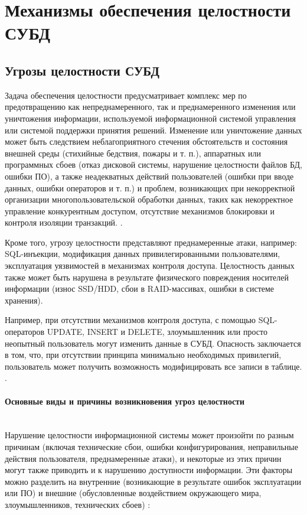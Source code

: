 \section{Механизмы обеспечения целостности СУБД}

\subsection{Угрозы целостности СУБД}
Задача обеспечения целостности предусматривает комплекс мер по предотвращению как непреднамеренного, так и преднамеренного изменения или уничтожения информации, используемой информационной системой управления или системой поддержки принятия решений. Изменение или уничтожение данных может быть следствием неблагоприятного стечения обстоятельств и состояния внешней среды (стихийные бедствия, пожары и т. п.), аппаратных или программных сбоев (отказ дисковой системы, нарушение целостности файлов БД, ошибки ПО), а также неадекватных действий пользователей (ошибки при вводе данных, ошибки операторов и т. п.) и проблем, возникающих при некорректной организации многопользовательской обработки данных, таких как некорректное управление конкурентным доступом, отсутствие механизмов блокировки и контроля изоляции транзакций. \autocite{Lihonosov2011, postgredoc1}.

Кроме того, угрозу целостности представляют преднамеренные атаки, например: SQL-инъекции, модификация данных привилегированными пользователями, эксплуатация уязвимостей в механизмах контроля доступа. Целостность данных также может быть нарушена в результате физического повреждения носителей информации (износ SSD/HDD, сбои в RAID-массивах, ошибки в системе хранения).

Например, при отсутствии механизмов контроля доступа, с помощью SQL-операторов UPDATE, INSERT и DELETE, злоумышленник или просто неопытный пользователь могут изменить данные в СУБД. Опасность заключается в том, что, при отсутствии принципа минимально необходимых привилегий, пользователь может получить возможность модифицировать все записи в таблице.  \autocite{Utebov2008, nist80012}.

\paragraph{Основные виды и причины возникновения угроз целостности} ~\\

Нарушение целостности информационной системы может произойти по разным причинам (включая технические сбои, ошибки конфигурирования, неправильные действия пользователя, преднамеренные атаки), и некоторые из этих причин могут также приводить и к нарушению доступности информации. \autocite{Pirogov2009}
Эти факторы можно разделить на внутренние (возникающие в результате ошибок эксплуатации или ПО) и внешние (обусловленные воздействием окружающего мира, злоумышленников, технических сбоев) \autocites{IntuitThreats, HabrCloudThreats, WikiExploit, KasperskyDailyOAuth}:

